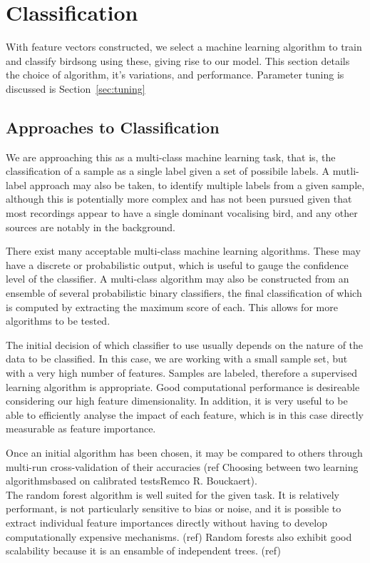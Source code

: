 \section{Classification}
With feature vectors constructed, we select a machine learning algorithm to
train and classify birdsong using these, giving rise to our model.
This section details the choice of algorithm, it's variations, and performance.
Parameter tuning is discussed is Section~\ref{sec:tuning}

\subsection{Approaches to Classification}
We are approaching this as a multi-class machine learning task, that is, the
classification of a sample as a single label given a set of possibile labels.
A mutli-label approach may also be taken, to identify multiple labels from a
given sample, although this is potentially more complex and has not been
pursued given that most recordings appear to have a single dominant vocalising
bird, and any other sources are notably in the background.

There exist many acceptable multi-class machine learning algorithms.
These may have a discrete or probabilistic output, which is useful to gauge the
confidence level of the classifier.
A multi-class algorithm may also be constructed from an ensemble of several
probabilistic binary classifiers, the final classification of which is computed
by extracting the maximum score of each.
This allows for more algorithms to be tested.

The initial decision of which classifier to use usually depends on the nature
of the data to be classified.
In this case, we are working with a small sample set, but with a very high number
of features.
Samples are labeled, therefore a supervised learning algorithm is appropriate.
Good computational performance is desireable considering our high feature
dimensionality.
In addition, it is very useful to be able to efficiently analyse the impact of
each feature, which is in this case directly measurable as feature importance.

Once an initial algorithm has been chosen, it may be compared to others through
multi-run cross-validation of their accuracies
(ref Choosing between two learning algorithmsbased on calibrated testsRemco R. Bouckaert).\\

The random forest algorithm is well suited for the given task.
It is relatively performant, is not particularly sensitive to bias or noise,
and it is possible to extract individual feature importances directly without
having to develop computationally expensive mechanisms. (ref)
Random forests also exhibit good scalability because it is an ensamble of
independent trees. (ref)

